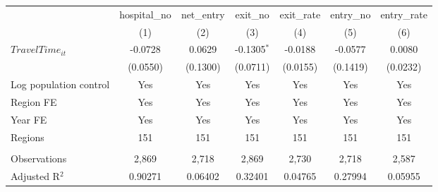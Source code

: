 \begingroup
\centering
\begin{tabular}{lcccccc}
   \toprule
                          & hospital\_no  & net\_entry  & exit\_no      & exit\_rate  & entry\_no  & entry\_rate \\    
                          & (1)           & (2)         & (3)           & (4)         & (5)        & (6)\\  
   \midrule 
   $TravelTime_{it}$      & -0.0728       & 0.0629      & -0.1305$^{*}$ & -0.0188     & -0.0577    & 0.0080\\   
                          & (0.0550)      & (0.1300)    & (0.0711)      & (0.0155)    & (0.1419)   & (0.0232)\\   
   Log population control & Yes           & Yes         & Yes           & Yes         & Yes        & Yes\\  
   Region FE              & Yes           & Yes         & Yes           & Yes         & Yes        & Yes\\  
   Year FE                & Yes           & Yes         & Yes           & Yes         & Yes        & Yes\\  
   Regions                & 151           & 151         & 151           & 151         & 151        & 151\\  
    \\
   Observations           & 2,869         & 2,718       & 2,869         & 2,730       & 2,718      & 2,587\\  
   Adjusted R$^2$         & 0.90271       & 0.06402     & 0.32401       & 0.04765     & 0.27994    & 0.05955\\  
   \bottomrule
\end{tabular}
\par\endgroup
